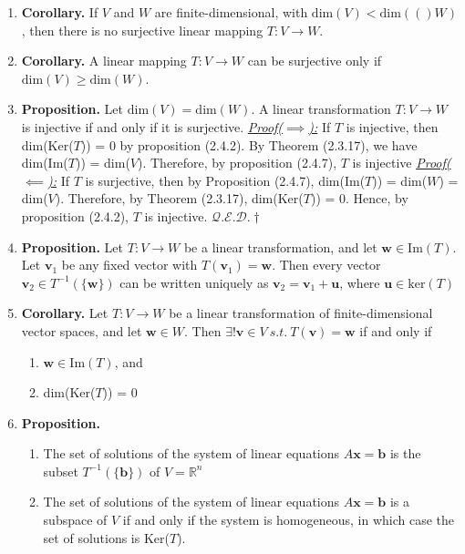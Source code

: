 \documentclass[oneside, 12pt]{book}
\newcommand{\settag}[1]{\renewcommand{\theenumi}{#1}}
\newcommand{\R}{\mathbb{R}}
\newcommand{\qed}{\hfill $\mathcal{Q}.\mathcal{E}.\mathcal{D}.\dagger$}
\newcommand{\tbf}[1]{\textbf{#1}}
\newcommand{\tit}[1]{\textit{#1}}
\newcommand{\proofforward}{\tit{\underline{Proof($\implies$):}}}
\newcommand{\proofback}{\tit{\underline{Proof($\impliedby$):}}}
\newcommand{\trans}[3]{$#1:#2\rightarrow{}#3$}
\newcommand{\dime}[1]{\text{dim}(#1)}
\newcommand{\para}[1]{\item \tbf{#1}}
\newcommand{\vb}{\mathbf{b}}
\newcommand{\vv}{\mathbf{v}}
\newcommand{\vu}{\mathbf{u}}
\newcommand{\vw}{\mathbf{w}}
\newcommand{\vx}{\mathbf{x}}
\begin{document}
\begin{enumerate}
        \settag{2.4.8}
        \para{Corollary.} If $V$ and $W$ are finite-dimensional, with $\dime{V} < \dime(W)$, then there is no surjective linear mapping \trans{T}{V}{W}.
        
        \settag{2.4.9}
        \para{Corollary.} A linear mapping \trans{T}{V}{W} can be surjective only if $\dime{V} \geq \dime{W}$.
        
        \settag{2.4.10}
        \para{Proposition.} Let $\dime{V} = \dime{W}$. A linear transformation \trans{T}{V}{W} is injective if and only if it is surjective. \newline
        \proofforward \newline
        If $T$ is injective, then dim(Ker($T$)) = 0 by proposition (2.4.2). By Theorem (2.3.17), we have dim(Im($T$)) = dim($V$). Therefore, by proposition (2.4.7), $T$ is injective \newline
        \proofback \newline
        If $T$ is surjective, then by Proposition (2.4.7), dim(Im($T$)) = dim($W$) = dim($V$). Therefore, by Theorem (2.3.17), dim(Ker($T$)) = 0. Hence, by proposition (2.4.2), $T$ is injective. \qed
        
        \settag{2.4.11}
        \para{Proposition.} Let \trans{T}{V}{W} be a linear transformation, and let $\vw \in \text{Im}(T)$. Let $\vv_1$ be any fixed vector with $T(\vv_1) = \vw$. Then every vector $\vv_2\in T^{-1}\left(\{\vw\}\right)$ can be written uniquely as $\vv_2 = \vv_1 + \vu$, where $\vu \in \text{ker}(T)$
        
        \settag{2.4.15}
        \para{Corollary.} Let \trans{T}{V}{W} be a linear transformation of finite-dimensional vector spaces, and let $\vw\in W$. Then $\exists! \vv \in V~s.t.~T(\vv) = \vw$ if and only if
        \begin{enumerate}
            \item $\vw \in \text{Im}(T)$, and
            \item dim(Ker($T$)) = $0$
        \end{enumerate}
        
        \settag{2.4.16}
        \para{Proposition.}
        \begin{enumerate}
            \item The set of solutions of the system of linear equations $A\vx = \vb$ is the subset $T^{-1}\left(\{\vb\}\right)$ of $V = \R^n$
            \item The set of solutions of the system of linear equations $A\vx = \vb$ is a subspace of $V$ if and only if the system is homogeneous, in which case the set of solutions is Ker($T$).
        \end{enumerate}
        

\end{enumerate}
\end{document}
